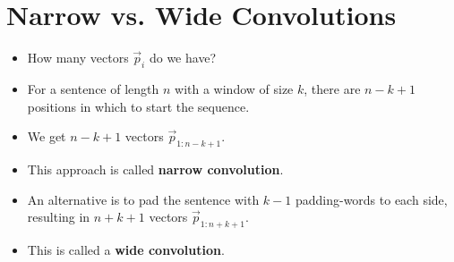 \section{Narrow vs. Wide Convolutions}
\begin{itemize}
\item How many vectors $\vec{p}_i$ do we have?
\item For a sentence of length $n$ with a window of size $k$, there are $n - k + 1$ positions in which to start the sequence. 
\item We get $n - k + 1$ vectors $\vec{p}_{1:n-k+1}$. 
\item This approach is called \textbf{narrow convolution}.
\item An alternative is to pad the sentence with $k - 1$ padding-words to each side, resulting in $n+k+1$ vectors $\vec{p}_{1:n+k+1}$. 
\item This is called a \textbf{wide convolution}.
\end{itemize}





